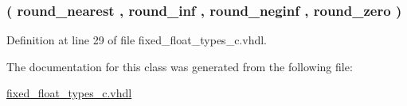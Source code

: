 \hypertarget{classfixed__float__types_a3cab38cfb8c7d6b81f4f0b9953cd212f}{}
\subsubsection[{round\+\_\+type}]{ {\bfseries \textcolor{vhdlchar}{(}\textcolor{vhdlchar}{ }\textcolor{vhdlchar}{round\+\_\+nearest}\textcolor{vhdlchar}{ }\textcolor{vhdlchar}{,}\textcolor{vhdlchar}{ }\textcolor{vhdlchar}{round\+\_\+inf}\textcolor{vhdlchar}{ }\textcolor{vhdlchar}{,}\textcolor{vhdlchar}{ }\textcolor{vhdlchar}{round\+\_\+neginf}\textcolor{vhdlchar}{ }\textcolor{vhdlchar}{,}\textcolor{vhdlchar}{ }\textcolor{vhdlchar}{round\+\_\+zero}\textcolor{vhdlchar}{ }\textcolor{vhdlchar}{)}\textcolor{vhdlchar}{ }} \hspace{0.3cm}{\ttfamily [Type]}}\label{classfixed__float__types_a3cab38cfb8c7d6b81f4f0b9953cd212f}


Definition at line 29 of file fixed\+\_\+float\+\_\+types\+\_\+c.\+vhdl.



The documentation for this class was generated from the following file\+:\begin{DoxyCompactItemize}
\item 
\hyperlink{fixed__float__types__c_8vhdl}{fixed\+\_\+float\+\_\+types\+\_\+c.\+vhdl}\end{DoxyCompactItemize}
